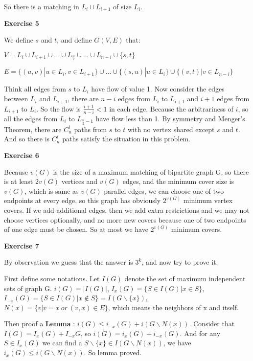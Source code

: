 \documentclass{article}
\begin{document}
So there is a matching in $L_{i} \cup L_{i+1}$ of size $L_{i}$.



\textbf{Exercise 5}

We define $s$ and $t$, and define $G(V,E)$ that:

$V = L_{i} \cup L_{i+1} \cup ... \cup L_{\frac{n}{2}} \cup ... \cup L_{n-i}  \cup \{s, t\}$

$E = \{  (u,v) | u \in L_{i}, v \in L_{i+1} \}\cup ... \cup \{(s,u) | u \in L_{i} \} \cup \{(v,t) | v \in L_{n-i} \}$

Think all edges from $s$ to $L_{i}$ have flow of value 1. Now consider the edges between $L_{i}$ and $L_{i+1}$, there are $n-i$ edges from $L_{i}$ to $L_{i+1}$ and $i+1$ edges from $L_{i+1}$ to $L_{i}$. So the flow is $\frac{i+1}{n-i} < 1$ in each edge. Because the arbitrariness of $i$, so all the edges from $L_{i}$ to $L_{\frac{n}{2} - 1}$ have flow less than 1. By symmetry and Menger’s Theorem, there are $C_{n}^{i}$ paths from $s$ to $t$ with no vertex shared except $s$ and $t$. And so there is $C_{n}^{i}$ paths satisfy the situation in this problem.




\textbf{Exercise 6}

Because $v(G)$ is the size of a maximum matching of bipartite graph G, so there is at least $2v(G)$ vertices and $v(G)$ edges, and the minimum cover size is $v(G)$, which is same as $v(G)$ parallel edges, we can choose one of two endpoints at every edge, so this graph has obviously $2^{v(G)}$ minimum vertex covers. If we add additional edges, then we add extra restrictions and we may not choose vertices optionally, and no more new covers because one of two endpoints of one edge must be chosen. So at most we have $2^{v(G)}$ minimum covers.

\textbf{Exercise 7}

By observation we guess that the answer is $3^k$, and now try to prove it.

First define some notations. Let $I(G)$ denote the set of maximum independent sets of graph G.
 $i(G) = |I(G)|$, $I_{x}(G) = \{ S \in I(G) | x \in S \}$, $I_{-x}(G) = \{ S \in I(G) | x \notin S \} = I ( G\backslash \{ x \}  )$, $N(x) = \{ v | v = x \ or \ 
 (v,x) \in E \}$, which means the neighbors of x and itself.
 
Then proof a \textbf{Lemma} : $i(G) \leqslant i_{-x}(G) + i(G\backslash N(x))$. Consider that $I(G) = I_{x}(G) + I_{-x}{G}$, so $i(G) = i_{x}(G) + i_{-x}(G)$. And for any $S \in I_{x}(G)$ we can find a $S \backslash \{ x \}   \in I(G\backslash N(x))$, we have $i_{x}(G) \leqslant i(G\backslash N(x))$. So lemma proved.
\end{document}
